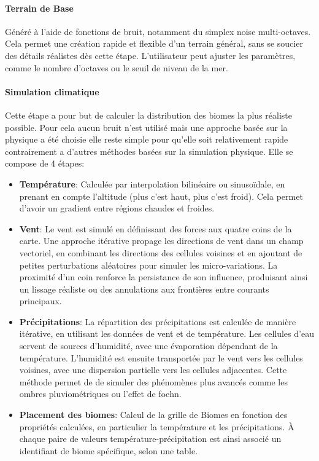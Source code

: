     \paragraph{Terrain de Base}
    Généré à l’aide de fonctions de bruit, notamment du simplex noise multi-octaves. Cela permet une création rapide et flexible d’un terrain général, sans se soucier des détails réalistes dès cette étape. L'utilisateur peut ajuster les paramètres, comme le nombre d'octaves ou le seuil de niveau de la mer.


    \paragraph{Simulation climatique}
    Cette étape a pour but de calculer la distribution des biomes la plus réaliste possible. Pour cela aucun bruit n'est utilisé mais une approche basée sur la physique a été choisie elle reste simple pour qu'elle soit relativement rapide contrairement a d'autres méthodes basées sur la simulation physique. Elle se compose de 4 étapes:
    \begin{itemize}
        \item \textbf{Température}: Calculée par interpolation bilinéaire ou sinusoïdale, en prenant en compte l’altitude (plus c’est haut, plus c’est froid). Cela permet d'avoir un gradient entre régions chaudes et froides.
        
        \item \textbf{Vent}: Le vent est simulé en définissant des forces aux quatre coins de la carte. Une approche itérative propage les directions de vent dans un champ vectoriel, en combinant les directions des cellules voisines et en ajoutant de petites perturbations aléatoires pour simuler les micro-variations. La proximité d’un coin renforce la persistance de son influence, produisant ainsi un lissage réaliste ou des annulations aux frontières entre courants principaux.
        
        \item \textbf{Précipitations}: La répartition des précipitations est calculée de manière itérative, en utilisant les données de vent et de température. Les cellules d’eau servent de sources d’humidité, avec une évaporation dépendant de la température. L’humidité est ensuite transportée par le vent vers les cellules voisines, avec une dispersion partielle vers les cellules adjacentes. Cette méthode permet de de simuler des phénomènes plus avancés comme les ombres pluviométriques ou l'effet de foehn.

        \item \textbf{Placement des biomes}: Calcul de la grille de Biomes en fonction des propriétés calculées, en particulier la température et les précipitations. À chaque paire de valeurs température-précipitation est ainsi associé un identifiant de biome spécifique, selon une table.
    \end{itemize}
    
